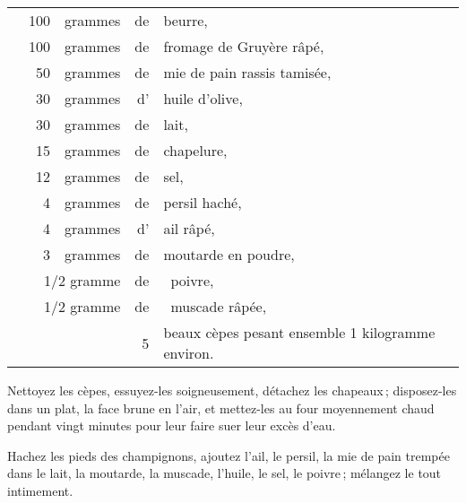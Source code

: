 \footnotesize
\begin{longtable}{rrrrp{16em}}
  &     100 & grammes & de & beurre,                                                                      \\
  &     100 & grammes & de & fromage de Gruyère râpé,                                                     \\
  &      50 & grammes & de & mie de pain rassis tamisée,                                                  \\
  &      30 & grammes & d' & huile d'olive,                                                               \\
  &      30 & grammes & de & lait,                                                                        \\
  &      15 & grammes & de & chapelure,                                                                   \\
  &      12 & grammes & de & sel,                                                                         \\
  &       4 & grammes & de & persil haché,                                                                \\
  &       4 & grammes & d' & ail râpé,                                                                    \\
  &       3 & grammes & de & moutarde en poudre,                                                          \\
  & \multicolumn{2}{r}{1/2 gramme}   & de & poivre,                                                       \\
  & \multicolumn{2}{r}{1/2 gramme}   & de & muscade râpée,                                                \\
  &         &         &  5 & beaux cèpes pesant ensemble 1 kilogramme environ.                            \\
\end{longtable}
\normalsize

Nettoyez les cèpes, essuyez-les soigneusement, détachez les chapeaux ;
disposez-les dans un plat, la face brune en l'air, et mettez-les au four
moyennement chaud pendant vingt minutes pour leur faire suer leur excès d'eau.

Hachez les pieds des champignons, ajoutez l'ail, le persil, la mie de pain
trempée dans le lait, la moutarde, la muscade, l'huile, le sel, le poivre ;
mélangez le tout intimement.

